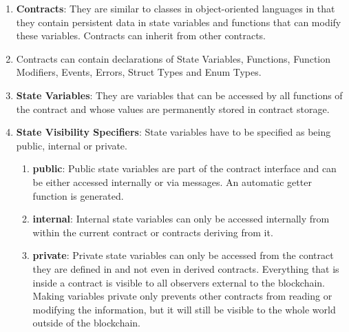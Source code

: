\begin{enumerate}
\item\textbf{Contracts}: They are similar to classes in object-oriented languages in that they contain persistent data in state variables and functions that can modify these variables. Contracts can inherit from other contracts.

\item Contracts can contain declarations of State Variables, Functions, Function Modifiers, Events, Errors, Struct Types and Enum Types.

\item\textbf{State Variables}: They are variables that can be accessed by all functions of the contract and whose values are permanently stored in contract storage.

\item\textbf{State Visibility Specifiers}: State variables have to be specified as being public, internal or private.
    \begin{enumerate}
    \item\textbf{public}: Public state variables are part of the contract interface and can be either accessed internally or via messages. An automatic getter function is generated.
    \item\textbf{internal}: Internal state variables can only be accessed internally from within the current contract or contracts deriving from it.
    \item\textbf{private}: Private state variables can only be accessed from the contract they are defined in and not even in derived contracts. Everything that is inside a contract is visible to all observers external to the blockchain. Making variables private only prevents other contracts from reading or modifying the information, but it will still be visible to the whole world outside of the blockchain.
    \end{enumerate}


\end{enumerate}
